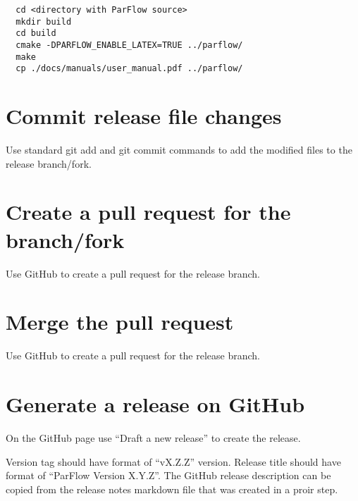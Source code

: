 \begin{display}\begin{verbatim}
  cd <directory with ParFlow source>
  mkdir build
  cd build
  cmake -DPARFLOW_ENABLE_LATEX=TRUE ../parflow/
  make
  cp ./docs/manuals/user_manual.pdf ../parflow/
\end{verbatim}\end{display}
  
\section{Commit release file changes}

Use standard git add and git commit commands to add the modified files
to the release branch/fork.

\section{Create a pull request for the branch/fork}

Use GitHub to create a pull request for the release branch.
  
\section{Merge the pull request}

Use GitHub to create a pull request for the release branch.
  
\section{Generate a release on GitHub}

On the GitHub  page use
``Draft a new release'' to create the release.

Version tag should have format of ``vX.Z.Z'' version.  Release title
should have format of ``ParFlow Version X.Y.Z''.  The GitHub release
description can be copied from the release notes markdown file that
was created in a proir step.
